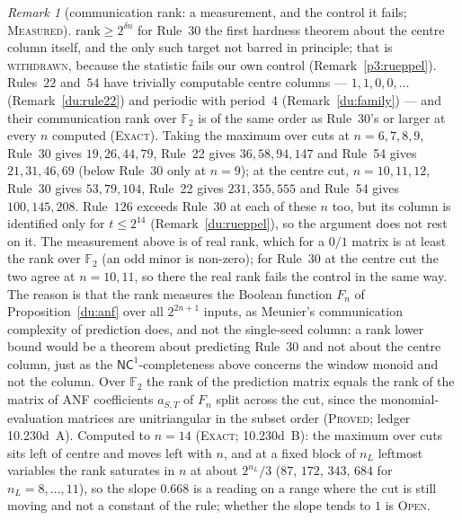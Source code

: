 \documentclass[11pt]{article}
\theoremstyle{definition}
\theoremstyle{remark}
\newtheorem{remark}[theorem]{Remark}
\newcommand{\F}{\mathbb{F}_2}
\newcommand{\PROVED}{\textsc{Proved}}
\newcommand{\EXACT}{\textsc{Exact}}
\newcommand{\MEASURED}{\textsc{Measured}}
\newcommand{\OPEN}{\textsc{Open}}
\begin{document}
\begin{remark}[communication rank: a measurement, and the control it fails; \MEASURED]
$\mathrm{rank}\ge2^{\delta n}$ for Rule~30 the first hardness theorem about the centre column itself, and the only such target not barred in principle; that is \textsc{withdrawn}, because the statistic fails our own control (Remark~\ref{p3:rueppel}). Rules~$22$ and~$54$ have trivially computable centre columns --- $1,1,0,0,\dots$ (Remark~\ref{du:rule22}) and periodic with period~$4$ (Remark~\ref{du:family}) --- and their communication rank over $\F$ is of the same order as Rule~30's or larger at every $n$ computed (\EXACT). Taking the maximum over cuts at $n=6,7,8,9$, Rule~30 gives $19,26,44,79$, Rule~22 gives $36,58,94,147$ and Rule~54 gives $21,31,46,69$ (below Rule~30 only at $n=9$); at the centre cut, $n=10,11,12$, Rule~30 gives $53,79,104$, Rule~22 gives $231,355,555$ and Rule~54 gives $100,145,208$. Rule~$126$ exceeds Rule~30 at each of these $n$ too, but its column is identified only for $t\le2^{14}$ (Remark~\ref{du:rueppel}), so the argument does not rest on it. The measurement above is of real rank, which for a $0/1$ matrix is at least the rank over $\F$ (an odd minor is non-zero); for Rule~30 at the centre cut the two agree at $n=10,11$, so there the real rank fails the control in the same way. The reason is that the rank measures the Boolean function $F_n$ of Proposition~\ref{du:anf} over all $2^{2n+1}$ inputs, as Meunier's communication complexity of prediction does, and not the single-seed column: a rank lower bound would be a theorem about predicting Rule~30 and not about the centre column, just as the $\mathsf{NC}^1$-completeness above concerns the window monoid and not the column. Over $\F$ the rank of the prediction matrix equals the rank of the matrix of ANF coefficients $a_{S,T}$ of $F_n$ split across the cut, since the monomial-evaluation matrices are unitriangular in the subset order (\PROVED; ledger 10.230d~A). Computed to $n=14$ (\EXACT; 10.230d~B): the maximum over cuts sits left of centre and moves left with $n$, and at a fixed block of $n_L$ leftmost variables the rank saturates in $n$ at about $2^{n_L}/3$ ($87$, $172$, $343$, $684$ for $n_L=8,\dots,11$), so the slope $0.668$ is a reading on a range where the cut is still moving and not a constant of the rule; whether the slope tends to $1$ is \OPEN.
\end{remark}
\end{document}

